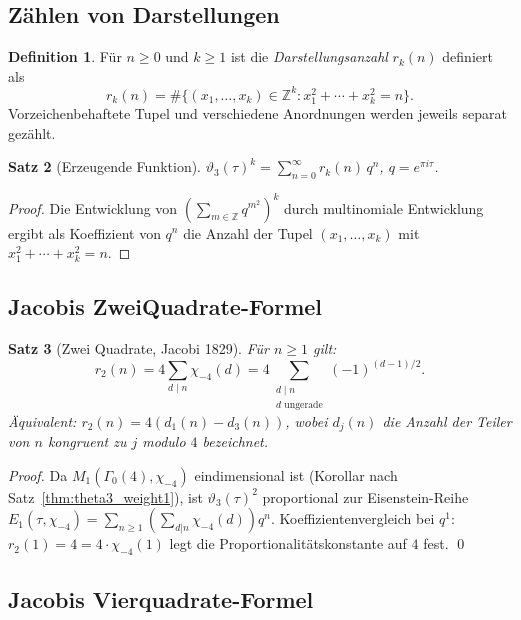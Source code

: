 \documentclass[12pt,a4paper]{amsart}
\newtheorem{theorem}{Satz}[section]
\theoremstyle{definition}
\newtheorem{definition}[theorem]{Definition}
\begin{document}
\subsection{Zählen von Darstellungen}

\begin{definition}
Für $n \geq 0$ und $k \geq 1$ ist die \emph{Darstellungsanzahl} $r_k(n)$ definiert als
\[
  r_k(n) = \#\{(x_1,\ldots,x_k)\in\mathbb{Z}^k : x_1^2+\cdots+x_k^2 = n\}.
\]
Vorzeichenbehaftete Tupel und verschiedene Anordnungen werden jeweils separat gezählt.
\end{definition}

\begin{theorem}[Erzeugende Funktion]\label{thm:gen_rk}
$\displaystyle\vartheta_3(\tau)^k = \sum_{n=0}^{\infty} r_k(n)\, q^n$,
\quad $q = e^{\pi i\tau}$.
\end{theorem}

\begin{proof}
Die Entwicklung von $(\sum_{m\in\mathbb{Z}} q^{m^2})^k$ durch multinomiale Entwicklung
ergibt als Koeffizient von $q^n$ die Anzahl der Tupel $(x_1,\ldots,x_k)$ mit
$x_1^2+\cdots+x_k^2 = n$.
\end{proof}

\subsection{Jacobis ZweiQuadrate-Formel}

\begin{theorem}[Zwei Quadrate, Jacobi 1829]\label{thm:r2}
Für $n \geq 1$ gilt:
\[
  r_2(n) = 4\sum_{d \mid n} \chi_{-4}(d)
  = 4\!\!\sum_{\substack{d \mid n \\ d \text{ ungerade}}} (-1)^{(d-1)/2}.
\]
Äquivalent: $r_2(n) = 4(d_1(n) - d_3(n))$, wobei $d_j(n)$ die Anzahl der Teiler
von $n$ kongruent zu $j$ modulo $4$ bezeichnet.
\end{theorem}

\begin{proof}
Da $M_1(\Gamma_0(4),\chi_{-4})$ eindimensional ist (Korollar nach
Satz~\ref{thm:theta3_weight1}), ist $\vartheta_3(\tau)^2$ proportional zur
Eisenstein-Reihe $E_1(\tau,\chi_{-4}) = \sum_{n\geq1}(\sum_{d|n}\chi_{-4}(d))q^n$.
Koeffizientenvergleich bei $q^1$: $r_2(1) = 4 = 4\cdot\chi_{-4}(1)$
legt die Proportionalitätskonstante auf $4$ fest. \qed
\end{proof}

\subsection{Jacobis Vierquadrate-Formel}
\end{document}
